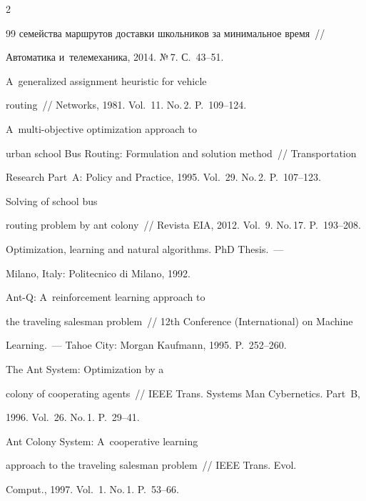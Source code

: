 \begin{multicols}{2}
{{\begin{thebibliography}{99}
семейства маршрутов доставки школьников за минимальное время~//

Автоматика и~телемеханика, 2014. №\,7. С.~43--51.


 A~generalized assignment heuristic for vehicle

routing~// Networks, 1981. Vol.~11. No.\,2. P.~109--124.


 A~multi-objective optimization approach to

urban school Bus Routing: Formulation and solution method~// Transportation

Research Part~A: Policy and Practice, 1995. Vol.~29. No.\,2. P.~107--123.


 Solving of school bus

routing problem by ant colony~// Revista EIA, 2012. Vol.~9. No.\,17. P.~193--208.


 Optimization, learning and natural algorithms. PhD Thesis.~---

Milano, Italy: Politecnico di Milano, 1992.


 Ant-Q: A~reinforcement learning approach to

the traveling salesman problem~// 12th Conference (International) on Machine

Learning.~--- Tahoe City: Morgan Kaufmann, 1995. P.~252--260.


 The Ant System: Optimization by a

colony of cooperating agents~// IEEE Trans. Systems Man Cybernetics. Part~B,

1996. Vol.~26. No.\,1. P.~29--41.


 Ant Colony System: A~cooperative learning

approach to the traveling salesman problem~// IEEE Trans. Evol.

Comput., 1997. Vol.~1. No.\,1. P.~53--66.



\end{thebibliography}}}
\end{multicols}
